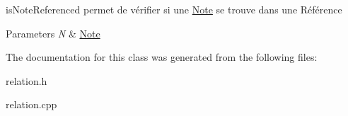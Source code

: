 is\+Note\+Referenced permet de vérifier si une \hyperlink{classNote}{Note} se trouve dans une Référence 


\begin{DoxyParams}{Parameters}
{\em N} & \hyperlink{classNote}{Note} \\
\hline
\end{DoxyParams}


The documentation for this class was generated from the following files\+:\begin{DoxyCompactItemize}
\item 
relation.\+h\item 
relation.\+cpp\end{DoxyCompactItemize}
